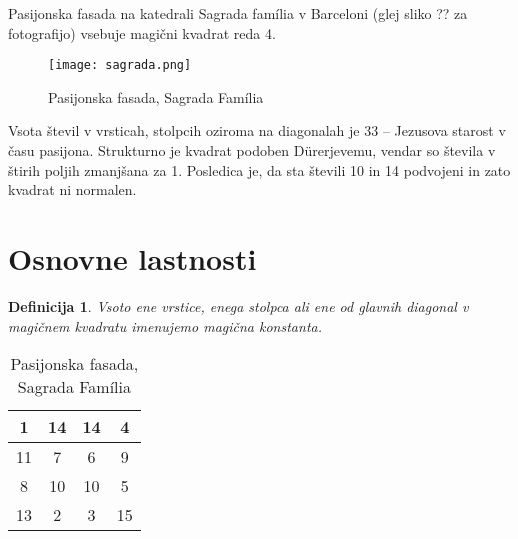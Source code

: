 \documentclass[a4paper,12pt]{article}
\newtheorem{definition}{Definicija}
\begin{document}
Pasijonska fasada na katedrali Sagrada família v Barceloni
(glej sliko ?? za fotografijo) vsebuje magični kvadrat reda 4.
\begin{figure}
   \centering
   \caption{Pasijonska fasada, Sagrada Família}
   \label{fig:sagrada}
   \texttt{[image: sagrada.png]}
\end{figure}


Vsota števil v vrsticah, stolpcih oziroma na diagonalah je 33 -- Jezusova starost
v času pasijona. Strukturno je kvadrat podoben Dürerjevemu, vendar so števila
v štirih poljih zmanjšana za 1. Posledica je, da sta števili 10 in 14 podvojeni
in zato kvadrat ni normalen.



\section{Osnovne lastnosti}

\begin{definition}
      Vsoto ene vrstice, enega stolpca ali ene od glavnih diagonal
      v magičnem kvadratu imenujemo \emph{magična konstanta}.
\end{definition}      

\begin{table}[h]
   \centering
   \caption{Pasijonska fasada, Sagrada Família}
   \label{table:sagrada}
   \begin{tabular}{|c|c|c|c|}
      \hline
      1 & 14 & 14 &  4 \\
      \hline
      11 &  7 &  6 &  9 \\
      \hline
      8 & 10 & 10 &  5 \\
      \hline
      13 &  2 &  3 & 15 \\
      \hline
      
   \end{tabular}
   
\end{table}
\end{document}
